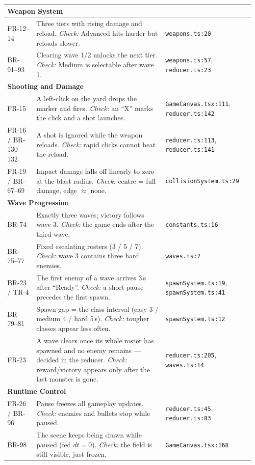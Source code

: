 \documentclass[12pt,a4paper]{report}
\begin{document}
\begin{longtable}{|p{1.5cm}|p{7.9cm}|p{4.2cm}|}
\multicolumn{3}{|l|}{\textbf{Weapon System}} \\ \hline
FR-12--14 & Three tiers with rising damage and reload. \emph{Check:} Advanced hits harder but reloads slower. & \texttt{weapons.ts:20} \\ \hline
BR-91--93 & Clearing wave 1/2 unlocks the next tier. \emph{Check:} Medium is selectable after wave 1. & \texttt{weapons.ts:57}, \texttt{reducer.ts:23} \\ \hline

\multicolumn{3}{|l|}{\textbf{Shooting and Damage}} \\ \hline
FR-15 & A left-click on the yard drops the marker and fires. \emph{Check:} an ``X'' marks the click and a shot launches. & \texttt{GameCanvas.tsx:111}, \texttt{reducer.ts:142} \\ \hline
FR-16 / BR-130--132 & A shot is ignored while the weapon reloads. \emph{Check:} rapid clicks cannot beat the reload. & \texttt{reducer.ts:113}, \texttt{reducer.ts:141} \\ \hline
FR-19 / BR-67--69 & Impact damage falls off linearly to zero at the blast radius. \emph{Check:} centre = full damage, edge $\approx$ none. & \texttt{collisionSystem.ts:29} \\ \hline

\multicolumn{3}{|l|}{\textbf{Wave Progression}} \\ \hline
BR-74 & Exactly three waves; victory follows wave 3. \emph{Check:} the game ends after the third wave. & \texttt{constants.ts:16} \\ \hline
BR-75--77 & Fixed escalating rosters (3 / 5 / 7). \emph{Check:} wave 3 contains three hard enemies. & \texttt{waves.ts:7} \\ \hline
BR-23 / TR-4 & The first enemy of a wave arrives 3\,s after ``Ready''. \emph{Check:} a short pause precedes the first spawn. & \texttt{spawnSystem.ts:19}, \texttt{spawnSystem.ts:41} \\ \hline
BR-79--81 & Spawn gap = the class interval (easy 3 / medium 4 / hard 5\,s). \emph{Check:} tougher classes appear less often. & \texttt{spawnSystem.ts:12} \\ \hline
FR-23 & A wave clears once its whole roster has spawned and no enemy remains --- decided in the reducer. \emph{Check:} reward/victory appears only after the last monster is gone. & \texttt{reducer.ts:205}, \texttt{waves.ts:14} \\ \hline

\multicolumn{3}{|l|}{\textbf{Runtime Control}} \\ \hline
FR-26 / BR-96 & Pause freezes all gameplay updates. \emph{Check:} enemies and bullets stop while paused. & \texttt{reducer.ts:45}, \texttt{reducer.ts:83} \\ \hline
BR-98 & The scene keeps being drawn while paused (fed $dt=0$). \emph{Check:} the field is still visible, just frozen. & \texttt{GameCanvas.tsx:168} \\ \hline


\end{longtable}
\end{document}
